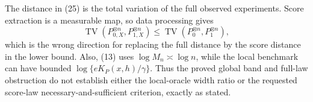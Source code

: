 The distance in (25) is the total variation of the full observed experiments.  Score extraction is a measurable map, so data processing gives
\[
 \operatorname{TV}(P_{0,X}^{\otimes n},P_{1,X}^{\otimes n})
 \le\operatorname{TV}(P_0^{\otimes n},P_1^{\otimes n}), \tag{28}
\]
which is the wrong direction for replacing the full distance by the score distance in the lower bound.  Also, (13) uses \(\log M_n\asymp\log n\), while the local benchmark can have bounded \(\log\{eK_P(x,h)/\gamma\}\).  Thus the proved global band and full-law obstruction do not establish either the local-oracle width ratio or the requested score-law necessary-and-sufficient criterion, exactly as stated.